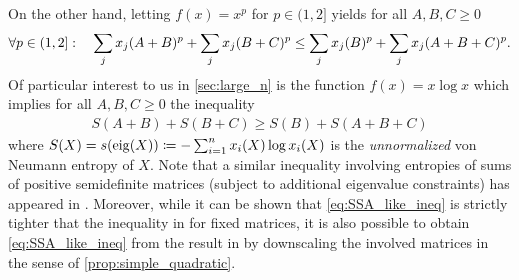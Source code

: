 \documentclass[notitlepage, 10pt]{article}
\begin{document}
On the other hand, letting $f(x) = x^p$ for $p \in (1,2]$ yields for all $A,B,C \geq 0$
\begin{equation}
    \label{eq:bouhtou_ineq_reverse}
    \forall p \in (1,2] : \quad \sum_{j}x_j(A+B)^p + \sum_{j}x_j(B+C)^p \leq \sum_{j}x_j(B)^p + \sum_{j}x_j(A+B+C)^p.
\end{equation}
Of particular interest to us in \cref{sec:large_n} is the function $f(x) = x \log x$ which implies for all $A,B,C\geq 0$ the inequality
\begin{align}
    \label{eq:SSA_like_ineq}
    S(A+B)+ S(B+C) \geq S(B) + S(A+B+C)
\end{align}
where $S(X) = s(\operatorname{eig}(X)) \coloneqq -\sum_{i=1}^{n} x_i(X)\log x_i(X)$ is the \textit{unnormalized} von Neumann entropy of $X$.
Note that a similar inequality involving entropies of sums of positive semidefinite matrices (subject to additional eigenvalue constraints) has appeared in \cite{christandl2018recoupling}.
Moreover, while it can be shown that \cref{eq:SSA_like_ineq} is strictly tighter that the inequality in \cite{christandl2018recoupling} for fixed matrices, it is also possible to obtain \cref{eq:SSA_like_ineq} from the result in \cite{christandl2018recoupling} by downscaling the involved matrices in the sense of \cref{prop:simple_quadratic}.
\end{document}
